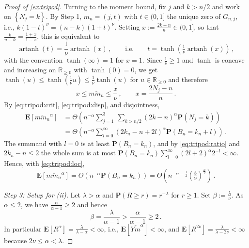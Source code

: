 \documentclass{article}
\newcommand{\R}{\mathbb{R}}
\newcommand{\Rp}{\R_{\geq0}}
\newcommand{\lcb}{\left\lbrace} %
\newcommand{\rcb}{\right\rbrace} %
\newcommand{\cb}[1]{\lcb #1 \rcb} %
\newcommand{\lab}{\left[} %
\newcommand{\rab}{\right]} %
\newcommand{\ab}[1]{\lab #1 \rab} %
\newcommand{\abOf}[1]{\!\ab{#1}} %
\newcommand{\lb}{\left(} %
\newcommand{\rb}{\right)} %
\newcommand{\br}[1]{\lb #1 \rb} %
\newcommand{\brOf}[1]{\!\br{#1}} %
\renewcommand{\Pr}{\mathbf{P}} %
\newcommand{\Prof}[1]{\Pr(#1)}
\newcommand{\PrOf}[1]{\Pr\brOf{#1}}
\newcommand{\E}{\mathbf{E}} %
\newcommand{\Eof}[1]{\E[#1]}
\newcommand{\EOf}[1]{\E\abOf{#1}}
\newcommand{\eqcm}{\,,} %
\newcommand{\eqfs}{\,.}
\newcommand{\ol}[2]{\overline{#1#2}}
\DeclareMathOperator{\artanh}{artanh}
\begin{document}
\begin{proof}[Proof of \cref{ex:tripod}]
    Turning to the moment bound, fix $j$ and $k>n/2$ and work on $\cb{N_j = k}$. By Step 1, $m_n = (j,t)$ with $t\in(0,1]$ the unique zero of $G_{n,j}$, i.e.,
    $k(1-t)^\nu = (n-k)(1+t)^\nu$. Setting $x := \frac{2k-n}{n}\in(0,1]$, so that $\frac{k}{n-k} = \frac{1+x}{1-x}$, this is equivalent to
    \begin{equation}
        \artanh(t) = \frac1\nu \artanh(x)
        \eqcm\qquad\text{i.e.}\qquad
        t = \tanh\brOf{\tfrac1\nu\artanh(x)}
        \eqcm
    \end{equation}
    with the convention $\tanh(\infty)=1$ for $x=1$. Since $\frac1\nu\geq1$ and $\tanh$ is concave and increasing on $\Rp$ with $\tanh(0)=0$, we get $\tanh(u) \leq \tanh(\frac1\nu u)\leq\frac1\nu\tanh(u)$ for $u\in\Rp$ and therefore
    \begin{equation}\label{eq:tripod:disp}
        x \leq \ol m{m_n} \leq \frac{x}{\nu}
        \eqcm\qquad
        x = \frac{2N_j-n}{n}
        \eqfs
    \end{equation}
    By \eqref{eq:tripod:crit}, \eqref{eq:tripod:disp}, and disjointness,
    \begin{align}
        \EOf{\ol m{m_n}^\alpha}
        &=
        \Theta\brOf{n^{-\alpha}\sum_{j=1}^3\ \sum_{k>n/2} (2k-n)^\alpha\PrOf{N_j = k}}
        \\&=
        \Theta\brOf{n^{-\alpha}\sum_{l=0}^\infty\br{2k_n-n+2l}^\alpha\PrOf{B_n = k_n+l}}
        \eqfs
    \end{align}
    The summand with $l=0$ is at least $\PrOf{B_n=k_n}$, and by \eqref{eq:tripod:ratio} and $2k_n-n\leq2$ the whole sum is at most $\PrOf{B_n=k_n}\sum_{l=0}^\infty(2l+2)^\alpha2^{-l}<\infty$. Hence, with \eqref{eq:tripod:loc},
    \begin{equation}
        \EOf{\ol m{m_n}^\alpha}
        =
        \Theta\brOf{n^{-\alpha}\PrOf{B_n=k_n}}
        =
        \Theta\brOf{n^{-\alpha-\frac12}\br{\tfrac89}^{\frac n2}}
        \eqfs
    \end{equation}
    
    \emph{Step 3: Setup for (ii).}
    Let $\lambda>\alpha$ and $\Prof{R\geq r} = r^{-\lambda}$ for $r\geq1$. Set $\beta := \frac\lambda\nu$. As $\alpha\leq2$, we have $\frac{\alpha}{\alpha-1}\geq2$ and hence
    \begin{equation}\label{eq:tripod:beta}
        \beta = \frac{\lambda}{\alpha-1} > \frac{\alpha}{\alpha-1}\geq 2
        \eqfs
    \end{equation}
    In particular $\Eof{R^\alpha} = \frac{\lambda}{\lambda-\alpha}<\infty$, i.e., $\Eof{\ol Ym^\alpha}<\infty$, and $\Eof{R^{2\nu}} = \frac{\lambda}{\lambda-2\nu}<\infty$ because $2\nu\leq\alpha<\lambda$.
    

\end{proof}
\end{document}
